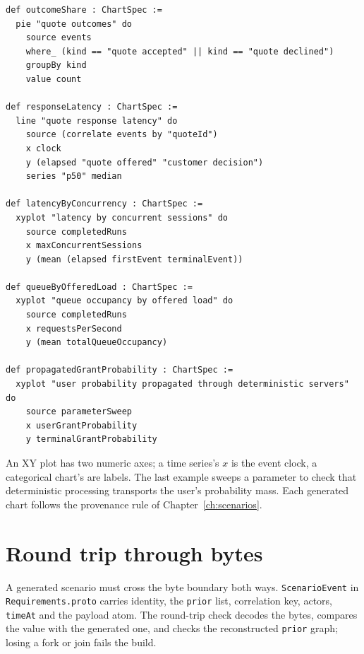 \begin{lstlisting}
def outcomeShare : ChartSpec :=
  pie "quote outcomes" do
    source events
    where_ (kind == "quote accepted" || kind == "quote declined")
    groupBy kind
    value count

def responseLatency : ChartSpec :=
  line "quote response latency" do
    source (correlate events by "quoteId")
    x clock
    y (elapsed "quote offered" "customer decision")
    series "p50" median

def latencyByConcurrency : ChartSpec :=
  xyplot "latency by concurrent sessions" do
    source completedRuns
    x maxConcurrentSessions
    y (mean (elapsed firstEvent terminalEvent))

def queueByOfferedLoad : ChartSpec :=
  xyplot "queue occupancy by offered load" do
    source completedRuns
    x requestsPerSecond
    y (mean totalQueueOccupancy)

def propagatedGrantProbability : ChartSpec :=
  xyplot "user probability propagated through deterministic servers" do
    source parameterSweep
    x userGrantProbability
    y terminalGrantProbability
\end{lstlisting}

An XY plot has two numeric axes; a time series's \(x\) is the event clock, a
categorical chart's are labels. The last example sweeps a parameter to check that
deterministic processing transports the user's probability mass. Each generated
chart follows the provenance rule of Chapter~\ref{ch:scenarios}.

\section{Round trip through bytes}

A generated scenario must cross the byte boundary both ways.
\texttt{ScenarioEvent} in \texttt{Requirements.proto} carries identity, the
\texttt{prior} list, correlation key, actors, \texttt{timeAt} and the payload
atom. The round-trip check decodes the bytes, compares the value with the generated
one, and checks the reconstructed \texttt{prior} graph; losing a fork or join
fails the build.

